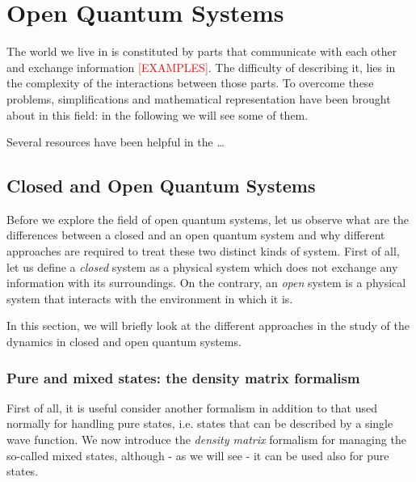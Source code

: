 \chapter{Open Quantum Systems}
\label{Chapter1}

\newcommand{\keyword}[1]{\textbf{#1}}
\newcommand{\tabhead}[1]{\textbf{#1}}
\newcommand{\code}[1]{\texttt{#1}}
\newcommand{\file}[1]{\texttt{\bfseries#1}}
\newcommand{\option}[1]{\texttt{\itshape#1}}

The world we live in is constituted by parts that communicate with each other and exchange information \textcolor{red}{[EXAMPLES]}. The difficulty of describing it, lies in the complexity of the interactions between those parts. To overcome these problems, simplifications and mathematical representation have been brought about in this field: in the following we will see some of them. 

Several resources have been helpful in the \dots

\section{Closed and Open Quantum Systems}
Before we explore the field of open quantum systems, let us observe what are the differences between a closed and an open quantum system and why different approaches are required to treat these two distinct kinds of system. First of all, let us define a \emph{closed} system as a physical system which does not exchange any information with its surroundings. On the contrary, an \emph{open} system is a physical system that interacts with the environment in which it is. 

In this section, we will briefly look at the different approaches in the study of the dynamics in closed and open quantum systems. 

\subsection{Pure and mixed states: the density matrix formalism}
First of all, it is useful consider another formalism in addition to that used normally for handling pure states, i.e. states that can be described by a single wave function. We now introduce the \emph{density matrix} formalism for managing the so-called mixed states, although - as we will see - it can be used also for pure states.

